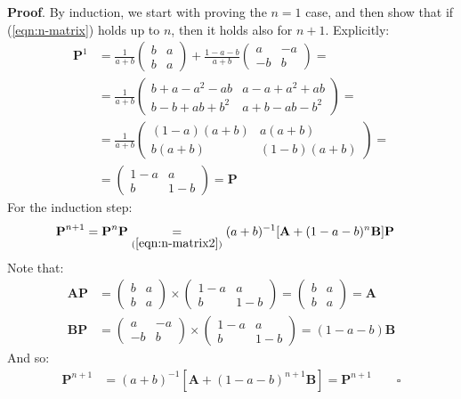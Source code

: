 \documentclass[../template.tex]{subfiles}
\begin{document}
\textbf{Proof}. By induction, we start with proving the $n=1$ case, and then show that if (\ref{eqn:n-matrix}) holds up to $n$, then it holds also for $n+1$. Explicitly:
\begin{align*}
    \textbf{P}^1 &= \frac{1}{a+b} \left(\begin{array}{cc}
    b & a \\ 
    b & a
    \end{array}\right) + \frac{1-a-b}{a+b} \left(\begin{array}{cc}
    a & -a \\ 
    -b & b
    \end{array}\right) =\\
    &= \frac{1}{a+b} \left(\begin{array}{cc}
    b+a-a^2-ab & a-a+a^2+ab \\ 
    b-b+ab+b^2 & a+b-ab-b^2
    \end{array}\right) =\\
    &= \frac{1}{a+b} \left(\begin{array}{cc}
    (1-a)(a+b) & a(a+b) \\ 
    b(a+b) & (1-b)(a+b)
    \end{array}\right) =\\
    &= \left(\begin{array}{cc}
    1-a & a \\ 
    b & 1-b
    \end{array}\right) = \textbf{P} 
\end{align*}
For the induction step:
\begin{align*}
    \textbf{P}^{n+1} &= \textbf{P}^n\textbf{P} \underset{(\ref{eqn:n-matrix2})}{=} (a+b)^{-1}[\textbf{A} + (1-a-b)^n \textbf{B}] \textbf{P} 
\end{align*}
Note that:
\begin{align*}
    \textbf{A} \textbf{P} &= \left(\begin{array}{cc}
    b & a \\ 
    b & a
    \end{array}\right)  \times \left(\begin{array}{cc}
    1-a & a \\ 
    b & 1-b
    \end{array}\right) = \left(\begin{array}{cc}
    b & a \\ 
    b & a
    \end{array}\right) = \textbf{A} \\
    \textbf{B}\textbf{P} &= \left(\begin{array}{cc}
    a & -a \\ 
    -b & b
    \end{array}\right) \times \left(\begin{array}{cc}
    1-a & a \\ 
    b & 1-b
    \end{array}\right)  = (1-a-b)\textbf{B} 
\end{align*}
And so:
\begin{align*}
    \textbf{P}^{n+1} &= (a+b)^{-1} [\textbf{A} + (1-a-b)^{n+1} \textbf{B} ] = \textbf{P}^{n+1} \qquad \square 
\end{align*}
\end{document}

